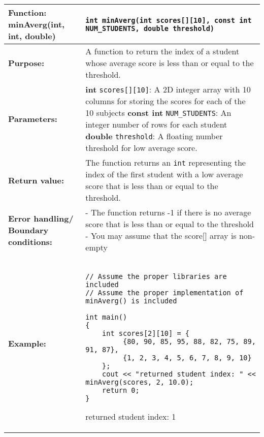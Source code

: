 \newpage
\begin{longtable}[H]{|p{1.7in}|p{4.0in}|} \hline
        \textbf{Function:} \newline 
        minAverg(int, int, double) & \texttt{int minAverg(int scores[][10], const int NUM_STUDENTS, double threshold)}
        \\ \hline
        \textbf{Purpose:}  & A function to return the index of a student whose average score is less than or equal to the threshold.\\ \hline
        \textbf{Parameters:} &  
        \textbf{int} \texttt{scores[][10]}: A 2D integer array with 10 columns for storing the scores for each of the 10 subjects \newline
        \textbf{const int} \texttt{NUM\_STUDENTS}: An integer number of rows for each student \newline
        \textbf{double} \texttt{threshold}: A floating number threshold for low average score. 
\\ \hline
        \textbf{Return value:} &  The function returns an \texttt{int} representing the index of the first student with a low average score that is less than or equal to the threshold. \\ \hline
        \textbf{Error handling/
Boundary conditions:} &  
- The function returns -1 if there is no average score that is less than or equal to the threshold \newline 
- You may assume that the score[] array is non-empty
\\ \hline
        \textbf{Example:} & 
        \begin{example}
        \begin{verbatim}

// Assume the proper libraries are included
// Assume the proper implementation of minAverg() is included

int main()
{
    int scores[2][10] = {
         {80, 90, 85, 95, 88, 82, 75, 89, 91, 87},  
         {1, 2, 3, 4, 5, 6, 7, 8, 9, 10}          
    };
    cout << "returned student index: " <<  minAverg(scores, 2, 10.0);
    return 0;
}
        \end{verbatim}
        \end{example}

        \begin{sample}
returned student index: 1
        \end{sample}
             \\ \hline
\end{longtable}

